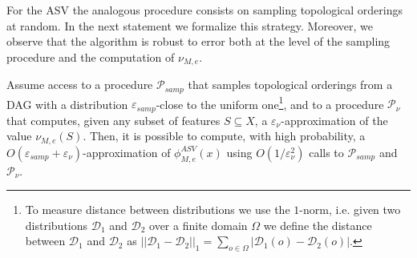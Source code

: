For the ASV the analogous procedure consists on sampling topological orderings at random. In the next statement we formalize this strategy. Moreover, we observe that the algorithm is robust to error both at the level of the sampling procedure and the computation of $\nu_{M,e}$.

\newcommand{\procedureSampling}{\mathcal{P}_{samp}}
\newcommand{\procedureNu}{\mathcal{P}_{\nu}}

\begin{proposition}\label{prop:sampling_to_compute_ASV}
	Assume access to a procedure $\procedureSampling$ that samples topological orderings from a DAG with a distribution $\varepsilon_{samp}$-close to the uniform one\footnote{To measure distance between distributions we use the $1$-norm, i.e. given two distributions $\mathcal{D}_1$ and $\mathcal{D}_2$ over a finite domain $\Omega$ we define the distance between $\mathcal{D}_1$ and $\mathcal{D}_2$ as $||\mathcal{D}_1 - \mathcal{D}_2||_1 = \sum_{o \in \Omega} |\mathcal{D}_1(o) - \mathcal{D}_2(o)|$.},
	and to a procedure $\procedureNu$ that computes, given any subset of features $S \subseteq X$, a $\varepsilon_{\nu}$-approximation of the value $\nu_{M,e}(S)$. Then, it is possible to compute, with high probability, a $O(\varepsilon_{samp} + \varepsilon_{\nu})$-approximation of $\phi^{ASV}_{M,e}(x)$ using $O(1/\varepsilon_{\nu}^2)$ calls to $\procedureSampling$ and $\procedureNu$. 
\end{proposition}

\newcommand{\randomVar}{V^{M,e}}


